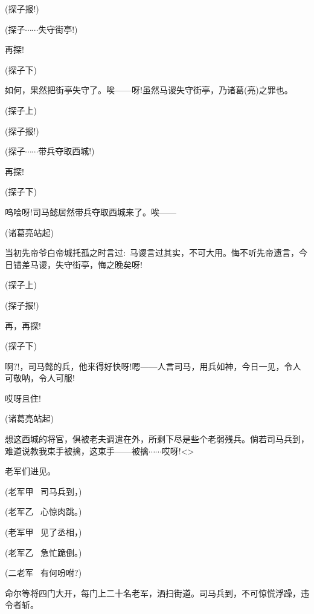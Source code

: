 {(探子\hspace{30pt}报!)

(探子\hspace{30pt}$\cdots{}\cdots{}$失守街亭!)

再探!

(探子{\hwfs 下})

如何，果然把街亭失守了。唉------呀!虽然马谡失守街亭，乃诸葛(亮)之罪也。

(探子{\hwfs 上})

(探子\hspace{30pt}报!)

(探子\hspace{30pt}$\cdots{}\cdots{}$带兵夺取西城!)

再探!

(探子{\hwfs 下})

呜哙呀!司马懿居然带兵夺取西城来了。唉------

(诸葛亮{\hwfs 站起})

当初先帝爷白帝城托孤之时言过:~马谡言过其实，不可大用。悔不听先帝遗言，今日错差马谡，失守街亭，悔之晚矣呀!

(探子{\hwfs 上})

(探子\hspace{30pt}报!)

再，再探!

(探子{\hwfs 下})

啊?!，司马懿的兵，他来得好快呀!嗯------人言司马，用兵如神，今日一见，令人可敬呐，令人可服!

哎呀且住!

(诸葛亮{\hwfs 站起})

想这西城的将官，俱被老夫调遣在外，所剩下尽是些个老弱残兵。倘若司马兵到，难道说教我束手被擒，这束手------被擒$\cdots{}\cdots{}$哎呀!\textless{}\!\textgreater{}

老军们进见。

(老军甲\hspace{20pt}~ 司马兵到，)

(老军乙\hspace{20pt}~ 心惊肉跳。)

(老军甲\hspace{20pt}~ 见了丞相，)

(老军乙\hspace{20pt}~ 急忙跪倒。)

(二老军\hspace{20pt}~ 有何吩咐?)

命尔等将四门大开，每门上二十名老军，洒扫街道。司马兵到，不可惊慌浮躁，违令者斩。

}
